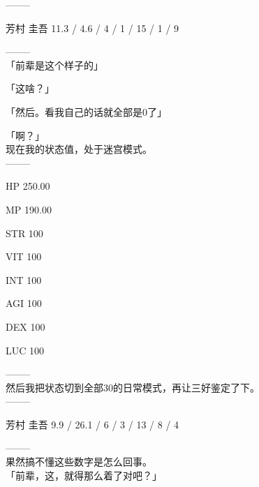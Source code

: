   --------

  芳村 圭吾 11.3 / 4.6 / 4 / 1 / 15 / 1 / 9

  --------\\

「前辈是这个样子的」

「这啥？」

「然后。看我自己的话就全部是0了」

「啊？」\\

现在我的状态值，处于迷宫模式。\\

  --------

  HP 250.00

  MP 190.00

%  
 

  STR 100

  VIT 100

  INT 100

  AGI 100

  DEX 100

  LUC 100

  --------\\

然后我把状态切到全部30的日常模式，再让三好鉴定了下。\\

  --------

  芳村 圭吾 9.9 / 26.1 / 6 / 3 / 13 / 8 / 4

  --------\\

果然搞不懂这些数字是怎么回事。\\

「前辈，这，就得那么着了对吧？」

